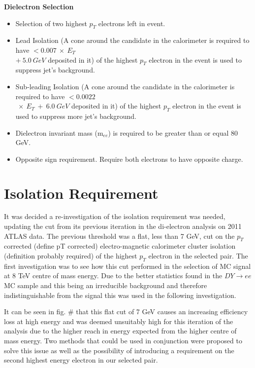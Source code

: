 {\bf Dielectron Selection}
\begin{itemize}
\item Selection of two highest $p_{T}$ electrons left in event.
\item Lead Isolation (A cone around the candidate in the calorimeter is required to have  $< 0.007~\times~E_{T}$\\$+~5.0~GeV$ deposited in it) of the highest $p_{T}$ electron in the event is used to suppress jet's background. 
\item Sub-leading Isolation (A cone around the candidate in the calorimeter is required to have  $< 0.0022$\\$~\times~E_{T}~+~6.0~GeV$ deposited in it) of the highest $p_{T}$ electron in the event is used to suppress more jet's background. 
\item Dielectron invariant mass (m$_{ee}$) is required to be greater than or equal 80 GeV.
\item Opposite sign requirement. Require both electrons to have opposite charge.
\end{itemize}




\section{Isolation Requirement}

It was decided a re-investigation of the isolation requirement was needed, updating the cut from its previous iteration in the di-electron analysis on 2011 ATLAS data. The previous threshold was a flat, less than 7 GeV, cut on the $p_{T}$ corrected (define pT corrected) electro-magnetic calorimeter cluster isolation (definition probably required) of the highest $p_{T}$ electron in the selected pair. The first investigation was to see how this cut performed in the selection of MC signal at 8 TeV centre of mass energy. Due to the better statistics found in the $DY{\rightarrow}ee$ MC sample and this being an irreducible background and therefore indistinguishable from the signal this was used in the following investigation.

It can be seen in fig. \# that this flat cut of 7 GeV causes an increasing efficiency loss at high energy and was deemed unsuitably high for this iteration of the analysis due to the higher reach in energy expected from the higher centre of mass energy. Two methods that could be used in conjunction were proposed to solve this issue as well as the possibility of introducing a requirement on the second highest energy electron in our selected pair.

